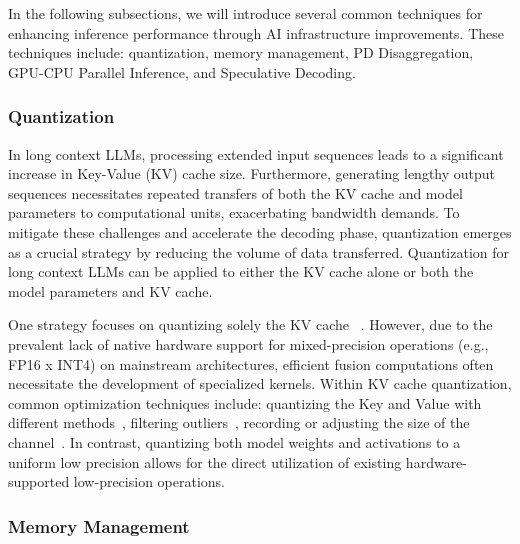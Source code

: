 \documentclass[11pt, a4paper, logo, copyright, nonumbering]{map}
\begin{document}
In the following subsections, we will introduce several common techniques for enhancing inference performance through AI infrastructure improvements. These techniques include: quantization, memory management, PD Disaggregation, GPU-CPU Parallel Inference, and Speculative Decoding.



\subsubsection{Quantization}

In long context LLMs, processing extended input sequences leads to a significant increase in Key-Value (KV) cache size.  Furthermore, generating lengthy output sequences necessitates repeated transfers of both the KV cache and model parameters to computational units, exacerbating  bandwidth demands.  To mitigate these challenges and accelerate the decoding phase, quantization emerges as a crucial strategy by reducing the volume of data transferred.  Quantization for long context LLMs can be applied to either the KV cache alone or both the model parameters and KV cache.

One strategy focuses on quantizing solely the KV cache ~\citep{pmlr-v235-liu24bz,kang2024gearefficientkvcache,hooper2025kvquant,zhang2024kv,dong2024qaqqualityadaptivequantization}.  However, due to the prevalent lack of native hardware support for mixed-precision operations (e.g., FP16 x INT4) on mainstream architectures, efficient fusion computations often necessitate the development of specialized kernels.  Within KV cache quantization, common optimization techniques include: quantizing the Key and Value with different methods~\citep{pmlr-v235-liu24bz,hooper2025kvquant}, filtering outliers~\citep{hooper2025kvquant,zhao2024atom}, recording or adjusting the size of the channel~\citep{zhao2024atom,duanmuskvq,xiao2023smoothquant}. In contrast, quantizing both model weights and activations to a uniform low precision \citep{yao2022zeroquant,zhao2024atom,xiao2023smoothquant,sheng2023flexgen,liu2024unlocking,yue2024wkvquant} allows for the direct utilization of existing hardware-supported low-precision operations.  




\subsubsection{Memory Management}
\end{document}

